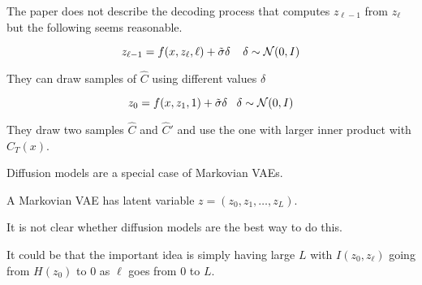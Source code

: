 {The paper does not describe the decoding process that computes $z_{\ell-1}$ from $z_\ell$ but the following seems reasonable.

$$z_{\ell-1} = f(x,z_\ell,\ell) +\tilde{\sigma}\delta\;\;\;\;\delta \sim {\cal N}(0,I)$$

\vfill
They can draw samples of $\hat{C}$ using different values $\delta$

$$z_0 = f(x,z_1,1) + \tilde{\sigma}\delta\;\;\;\delta \sim {\cal N}(0,I)$$

\vfill
They draw two samples $\hat{C}$ and $\hat{C}'$ and use the one with larger inner product with $C_T(x)$.


Diffusion models are a special case of Markovian VAEs.

\vfill
A Markovian VAE has latent variable $z = (z_0,z_1,\dots,z_{L})$.

\vfill
It is not clear whether diffusion models are the best way to do this.

\vfill
It could be that the important idea is simply having large $L$ with
$I(z_0,z_\ell)$ going from $H(z_0)$ to 0 as $\ell$ goes from $0$ to $L$.


}


